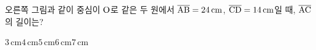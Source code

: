 \noindent\begin{minipage}[t]{0.58\linewidth}\vspace{0pt}\raggedright 오른쪽 그림과 같이 중심이 $\mathrm{O}$로 같은 두 원에서 $\overline{\mathrm{AB}}=24\,\mathrm{cm}$, $\overline{\mathrm{CD}}=14\,\mathrm{cm}$일 때, $\overline{\mathrm{AC}}$의 길이는?\end{minipage}\hfill\begin{minipage}[t]{0.4\linewidth}\vspace{0pt}\centering \resizebox{\ifdim\width>\linewidth\linewidth\else\width\fi}{!}{}\end{minipage}\par
\begin{choicesii}{$3\,\mathrm{cm}$}{$4\,\mathrm{cm}$}{$5\,\mathrm{cm}$}{$6\,\mathrm{cm}$}{$7\,\mathrm{cm}$}\end{choicesii}
